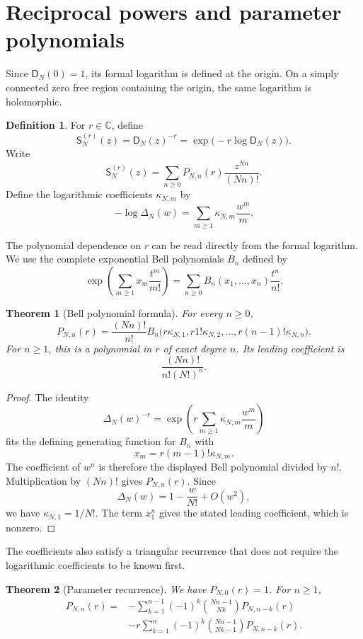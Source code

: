 \documentclass{aomart}
\newtheorem{theorem}{Theorem}[section]
\theoremstyle{definition}
\newtheorem{definition}[definition]{Definition}
\theoremstyle{remark}
\newcommand{\CC}{\mathbb C}
\newcommand{\Dfun}{\mathsf D}
\newcommand{\Sfun}{\mathsf S}
\begin{document}
\section{Reciprocal powers and parameter polynomials}\label{sec:reciprocal_powers}

Since $\Dfun_N(0)=1$, its formal logarithm is defined at the origin.  On a simply connected zero free region containing the origin, the same logarithm is holomorphic.

\begin{definition}\label{def:reciprocal_family}
For $r\in\CC$, define
\[
\Sfun_N^{(r)}(z)
=
\Dfun_N(z)^{-r}
=
\exp\bigl(-r\log\Dfun_N(z)\bigr).
\]
Write
\[
\Sfun_N^{(r)}(z)
=
\sum_{n\geq0}P_{N,n}(r)\frac{z^{Nn}}{(Nn)!}.
\]
Define the logarithmic coefficients $\kappa_{N,m}$ by
\[
-\log\Delta_N(w)
=
\sum_{m\geq1}\kappa_{N,m}\frac{w^m}{m}.
\]
\end{definition}

The polynomial dependence on $r$ can be read directly from the formal logarithm.  We use the complete exponential Bell polynomials $B_n$ defined by
\[
\exp\left(\sum_{m\geq1}x_m\frac{t^m}{m!}\right)
=
\sum_{n\geq0}B_n(x_1,\ldots,x_n)\frac{t^n}{n!}.
\]

\begin{theorem}[Bell polynomial formula]\label{thm:reciprocal_bell}
For every $n\geq0$,
\[
P_{N,n}(r)
=
\frac{(Nn)!}{n!}
B_n\bigl(
 r\kappa_{N,1},
 r1!\kappa_{N,2},
 \ldots,
 r(n-1)!\kappa_{N,n}
\bigr).
\]
For $n\geq1$, this is a polynomial in $r$ of exact degree $n$.  Its leading coefficient is
\[
\frac{(Nn)!}{n!(N!)^n}.
\]
\end{theorem}

\begin{proof}
The identity
\[
\Delta_N(w)^{-r}
=
\exp\left(
 r\sum_{m\geq1}\kappa_{N,m}\frac{w^m}{m}
\right)
\]
fits the defining generating function for $B_n$ with
\[
x_m=r(m-1)!\kappa_{N,m}.
\]
The coefficient of $w^n$ is therefore the displayed Bell polynomial divided by $n!$.  Multiplication by $(Nn)!$ gives $P_{N,n}(r)$.  Since
\[
\Delta_N(w)=1-\frac{w}{N!}+O(w^2),
\]
we have $\kappa_{N,1}=1/N!$.  The term $x_1^n$ gives the stated leading coefficient, which is nonzero.
\end{proof}

The coefficients also satisfy a triangular recurrence that does not require the logarithmic coefficients to be known first.

\begin{theorem}[Parameter recurrence]\label{thm:parameter_recurrence}
We have $P_{N,0}(r)=1$.  For $n\geq1$,
\[
\begin{aligned}
P_{N,n}(r)
={}&-
\sum_{k=1}^{n-1}
(-1)^k
\binom{Nn-1}{Nk}
P_{N,n-k}(r)
\\
&-r
\sum_{k=1}^{n}
(-1)^k
\binom{Nn-1}{Nk-1}
P_{N,n-k}(r).
\end{aligned}
\]
\end{theorem}
\end{document}
